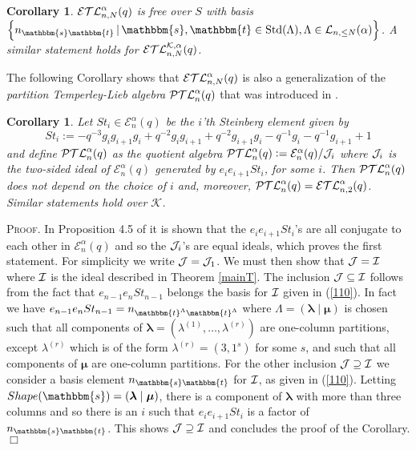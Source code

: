 \documentclass[10pt,a4,twoside,hidelinks,rm]{article}
\newcommand{\kk}{\mathcal{K}}
\newcommand\es{\mathbbm{s}}
\newcommand\et{\mathbbm{t}}
\newcommand{\std}{{\rm Std}}
\newcommand{\PTLa}{{\cal PTL}^{\alpha}_n(q)}
\newcommand{\Ea}{ {\mathcal E}_n^{\alpha}(q)}
\newcommand{\EaTLK}{ {\cal ETL}_{n,N}^{ {\cal K}, \alpha}(q)}
\newcommand{\EaTL}{ {\cal ETL}_{n,N}^{  \alpha}(q)}
\newcommand{\EaTLtwo}{ {\cal ETL}_{n,2}^{  \alpha}(q)}
\newcommand\blambda{{\boldsymbol\lambda}}
\newcommand\bmu{{\boldsymbol\mu}}
\theoremstyle{plain}
\newtheorem{coro}[teo]{Corollary}%
\newenvironment{demo}
{\textsc{Proof.}} {\quad \hfill $\Box$}
\begin{document}
\begin{coro}\label{cormaun}
$ \EaTL $ is free over $ S $ with basis 
$    \left\{ n_{\es\et} \, | \, \es, \et \in \std(\Lambda),
  \Lambda \in  {\cal L}_{n, \le N}(\alpha)  \right\} $. A similar statement holds
  for $ \EaTLK$.
\end{coro}
The following Corollary shows that 
$ \EaTL $ is also a generalization of the \textit{partition Temperley-Lieb algebra} $ \PTLa$ 
that was introduced in \cite{Juyumaya}. 

\begin{coro}
  Let $ St_i \in \Ea$ be the $ i$'th \textit{Steinberg element} given by 
  \begin{equation} St_i:=-q^{-3}g_i g_{i+1} g_i +q^{-2}g_i g_{i+1} +q^{-2}g_{i+1} g_i - q^{-1}g_i - q^{-1}g_{i+1} +1 \end{equation}
  and define $ \PTLa $ as the quotient algebra $ \PTLa := \Ea/{\cal J}_i $
  where $ {\cal J}_i $ is the two-sided ideal of $ \Ea $ generated by $ e_i e_{i+1} St_i  $, for some $ i$.
  Then $  \PTLa $ does not depend on the choice of $ i $ and, moreover,
$ \PTLa   = \EaTLtwo $.
  Similar statements hold over $ \kk$.
\end{coro}
\begin{demo}
  In Proposition 4.5 of \cite{Juyumaya} it is shown that the $ e_i e_{i+1} St_i $'s are all conjugate
  to each other in $ \Ea $ and so the $ {\cal J}_i $'s are equal ideals, which proves the first statement. 
For simplicity we write $ {\cal J}= {\cal J}_1   $. 
  We must then show that $ {\cal J }=  {\cal I } $ where $ \cal I$ is the ideal
  described in Theorem \ref{mainT}. The inclusion $ {\cal J } \subseteq  {\cal I } $ follows from
  the fact that $ e_{n-1} e_n St_{n-1} $ belongs the basis for $ \cal I $ given in (\ref{110}). In fact we have
  $ e_{n-1} e_n St_{n-1}  = n_{\et^{\Lambda} \et^{\Lambda}}$ where $ \Lambda = 
  ( \blambda \mid \bmu ) $ is chosen such that all components of $ \blambda = 
  ( \lambda^{(1)}, \ldots , \lambda^{(r)}) $ are one-column partitions, except $ \lambda^{(r)} $
  which is of the form $ \lambda^{(r)} = (3,1^s) $ for some $ s$, and such that all
  components of $ \bmu $ are one-column partitions. For the other inclusion
  $ {\cal J } \supseteq  {\cal I } $ we consider a basis element $ n_{\es\et}  $ for $ \cal I $, as given in
  (\ref{110}). Letting $ Shape(\es) = (\blambda \mid \bmu ) $, 
  there is a component of $ \blambda $ with more than three columns and so there is an
  $ i$ such that 
  $ e_{i} e_{i+1} St_{i} $ is a factor of $ n_{\es\et}  $. This shows
  $ {\cal J } \supseteq  {\cal I } $ and 
  concludes the proof of the Corollary.
\end{demo}
\end{document}

